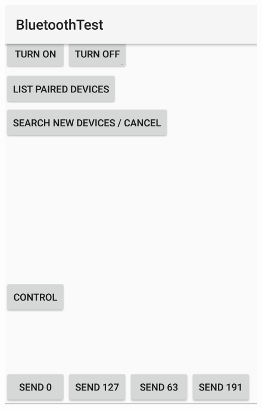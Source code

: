 \documentclass[a4paper]{article}
\begin{document}

\begin{figure}[H]
\includegraphics[scale=0.2]{Mobilapp1.png}

\end{figure}
\end{document}
